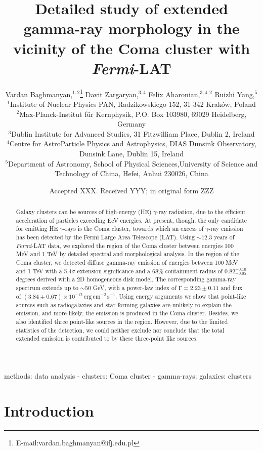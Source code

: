 \documentclass[fleqn,usenatbib]{mnras}
\title[Gamma-ray structure around the Coma cluster]{Detailed study of extended gamma-ray morphology in the vicinity of the Coma cluster with \textit{Fermi}-LAT}
\author[Baghmanyan et al. 2021]{
Vardan Baghmanyan,$^{1,2}$\thanks{E-mail:vardan.baghmanyan@ifj.edu.pl}
Davit Zargaryan,$^{3,4}$
Felix Aharonian,$^{3,4,2}$
Ruizhi Yang,$^{5}$
\newauthor{
Sabrina Casanova$^{1,2}$
and Jonathan Mackey $^{3,4}$
}
\\
$^{1}$Institute of Nuclear Physics PAN, Radzikowskiego 152, 31-342 Krak\'ow, Poland \\
$^{2}$Max-Planck-Institut f\"ur Kernphysik, P.O. Box 103980, 69029 Heidelberg, Germany \\
$^{3}$Dublin Institute for Advanced Studies, 31 Fitzwilliam Place, Dublin 2, Ireland \\
$^{4}$Centre for AstroParticle Physics and Astrophysics, DIAS Dunsink Observatory, Dunsink Lane, Dublin 15, Ireland \\
$^{5}$Department of Astronomy, School of Physical Sciences,University of Science and Technology of China, Hefei, Anhui 230026, China \\
}
\date{Accepted XXX. Received YYY; in original form ZZZ}
\begin{document}
\label{firstpage}
\pagerange{\pageref{firstpage}--\pageref{lastpage}}
\maketitle


\begin{abstract}

\noindent Galaxy clusters can be sources of high-energy (HE) $\gamma$-ray radiation, due to the efficient acceleration of particles exceeding EeV energies. At present, though, the only candidate for emitting HE $\gamma$-rays is the Coma cluster, towards which an excess of $\gamma$-ray emission has been detected by the Fermi Large Area Telescope (LAT). Using $\mathrm{\sim12.3}$ years of \textit{Fermi}-LAT data, we explored the region of the Coma cluster between energies 100 MeV and 1 TeV by detailed spectral and morphological analysis. In the region of the Coma cluster, we detected diffuse gamma-ray emission of energies between 100 MeV and 1 TeV with a 5.4$\sigma$ extension significance and a 68\% containment radius of $0.82^{+0.10}_{-0.05}$ degrees derived with a 2D homogeneous disk model. The corresponding gamma-ray spectrum extends up to $\sim50$ GeV, with a power-law index of $\mathrm{\Gamma=2.23\pm0.11}$ and flux of $\mathrm{(3.84\pm0.67)\times10^{-12}\,erg\,cm^{-2}\,s^{-1}}$. Using energy arguments we show that point-like sources such as radiogalaxies and star-forming galaxies are unlikely to explain the emission, and more likely, the emission is produced in the Coma cluster. Besides, we also identified three point-like sources in the region. However, due to the limited statistics of the detection, we could neither exclude nor conclude that the total extended emission is contributed to by these three-point like sources.



\end{abstract}

\begin{keywords}
methods: data analysis - clusters: Coma cluster - gamma-rays: galaxies: clusters 
\end{keywords}

\section{Introduction}
\end{document}
